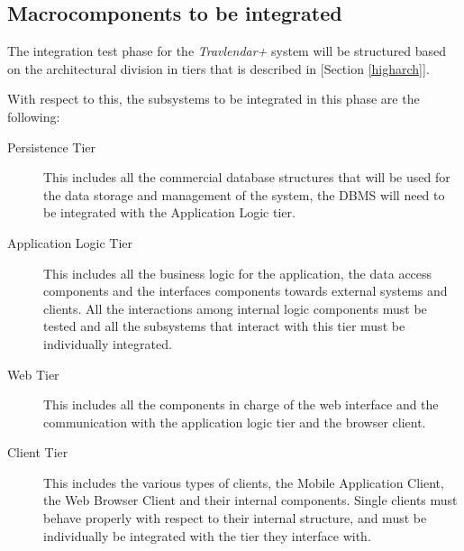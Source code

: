 \subsection{Macrocomponents to be integrated}

The integration test phase for the \emph{Travlendar+} system will be structured based on the architectural division in tiers that is described in [Section \ref{higharch}].

With respect to this, the subsystems to be integrated in this phase are the following:
\begin{description}
\item[Persistence Tier] This includes all the commercial database structures that will be used for the data storage and management of the system, the DBMS will need to be integrated with the Application Logic tier.
\item[Application Logic Tier] This includes all the business logic for the application, the data access components and the interfaces components towards external systems and clients. All the interactions among internal logic components must be tested and all the subsystems that interact with this tier must be individually integrated.
\item[Web Tier] This includes all the components in charge of the web interface and the communication with the application logic tier and the browser client.
\item[Client Tier] This includes the various types of clients, the Mobile Application Client, the Web Browser Client and their internal components. Single clients must behave properly with respect to their internal structure, and must be individually be integrated with the tier they interface with.
\end{description}
